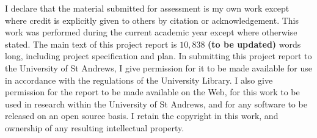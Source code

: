 I declare that the material submitted for assessment is my own work except where credit is explicitly given to others by citation or acknowledgement. This work was performed during the current academic year except where otherwise stated. The main text of this project report is $10,838$ \textbf{(to be updated)} words long, including project specification and plan. In submitting this project report to the University of St Andrews, I give permission for it to be made available for use in accordance with the regulations of the University Library. I also give permission for the report to be made available on the Web, for this work to be used in research within the University of St Andrews, and for any software to be released on an open source basis. I retain the copyright in this work, and ownership of any resulting intellectual property.
